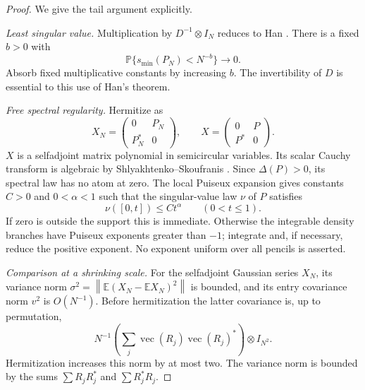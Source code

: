 \documentclass[11pt]{article}
\newcommand{\E}{\mathbb E}
\newcommand{\Prob}{\mathbb P}
\newcommand{\vecop}{\operatorname{vec}}
\newcommand{\norm}[1]{\left\lVert#1\right\rVert}
\begin{document}
\begin{proof}
We give the tail argument explicitly.

\emph{Least singular value.} Multiplication by $D^{-1}\otimes I_N$ reduces to Han \cite[Theorem 1.5]{han}. There is a fixed $b>0$ with
\begin{equation}\label{eq:lsv}
 \Prob\{s_{\min}(P_N)<N^{-b}\}\longrightarrow0.
\end{equation}
Absorb fixed multiplicative constants by increasing $b$. The invertibility of $D$ is essential to this use of Han's theorem.

\emph{Free spectral regularity.} Hermitize as
\[
 X_N=\begin{pmatrix}0&P_N\\P_N^*&0\end{pmatrix},\qquad
 X=\begin{pmatrix}0&P\\P^*&0\end{pmatrix}.
\]
$X$ is a selfadjoint matrix polynomial in semicircular variables. Its scalar Cauchy transform is algebraic by Shlyakhtenko--Skoufranis \cite[Theorems 1.1 and 5.4]{ss}. Since $\Delta(P)>0$, its spectral law has no atom at zero. The local Puiseux expansion gives constants $C>0$ and $0<\alpha<1$ such that the singular-value law $\nu$ of $P$ satisfies
\begin{equation}\label{eq:freepower}
 \nu([0,t])\le Ct^\alpha\qquad(0<t\le1).
\end{equation}
If zero is outside the support this is immediate. Otherwise the integrable density branches have Puiseux exponents greater than $-1$; integrate and, if necessary, reduce the positive exponent. No exponent uniform over all pencils is asserted.

\emph{Comparison at a shrinking scale.} For the selfadjoint Gaussian series $X_N$, its variance norm $\sigma^2=\norm{\E(X_N-\E X_N)^2}$ is bounded, and its entry covariance norm $v^2$ is $O(N^{-1})$. Before hermitization the latter covariance is, up to permutation,
\[
 N^{-1}\left(\sum_j\vecop(R_j)\vecop(R_j)^*\right)\otimes I_{N^2}.
\]
Hermitization increases this norm by at most two. The variance norm is bounded by the sums $\sum R_jR_j^*$ and $\sum R_j^*R_j$.


\end{proof}
\end{document}
